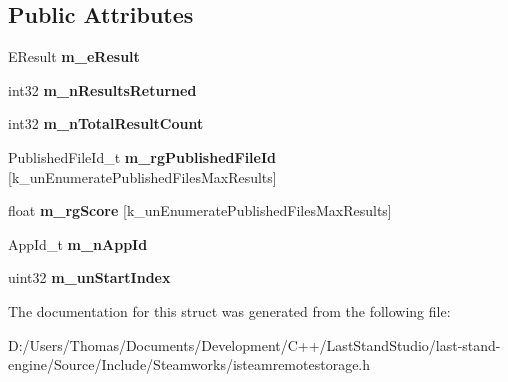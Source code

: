 \subsection*{Public Attributes}
\begin{DoxyCompactItemize}
\item 
\hypertarget{structRemoteStorageEnumerateWorkshopFilesResult__t_a6a98cfa954c7ce0c6ff0c6935a0f55cb}{}E\+Result {\bfseries m\+\_\+e\+Result}\label{structRemoteStorageEnumerateWorkshopFilesResult__t_a6a98cfa954c7ce0c6ff0c6935a0f55cb}

\item 
\hypertarget{structRemoteStorageEnumerateWorkshopFilesResult__t_a88c50bf47247cbf3a4af74aaad227236}{}int32 {\bfseries m\+\_\+n\+Results\+Returned}\label{structRemoteStorageEnumerateWorkshopFilesResult__t_a88c50bf47247cbf3a4af74aaad227236}

\item 
\hypertarget{structRemoteStorageEnumerateWorkshopFilesResult__t_af5e984a3c393dc6c6d34ef38156b280b}{}int32 {\bfseries m\+\_\+n\+Total\+Result\+Count}\label{structRemoteStorageEnumerateWorkshopFilesResult__t_af5e984a3c393dc6c6d34ef38156b280b}

\item 
\hypertarget{structRemoteStorageEnumerateWorkshopFilesResult__t_a9fb6272f5046468cc90f48203a52f71a}{}Published\+File\+Id\+\_\+t {\bfseries m\+\_\+rg\+Published\+File\+Id} \mbox{[}k\+\_\+un\+Enumerate\+Published\+Files\+Max\+Results\mbox{]}\label{structRemoteStorageEnumerateWorkshopFilesResult__t_a9fb6272f5046468cc90f48203a52f71a}

\item 
\hypertarget{structRemoteStorageEnumerateWorkshopFilesResult__t_ac22128e73f11e73c9a6fa612c43f1836}{}float {\bfseries m\+\_\+rg\+Score} \mbox{[}k\+\_\+un\+Enumerate\+Published\+Files\+Max\+Results\mbox{]}\label{structRemoteStorageEnumerateWorkshopFilesResult__t_ac22128e73f11e73c9a6fa612c43f1836}

\item 
\hypertarget{structRemoteStorageEnumerateWorkshopFilesResult__t_ac3f7586dac92d1d1a5798764cfd2c3e4}{}App\+Id\+\_\+t {\bfseries m\+\_\+n\+App\+Id}\label{structRemoteStorageEnumerateWorkshopFilesResult__t_ac3f7586dac92d1d1a5798764cfd2c3e4}

\item 
\hypertarget{structRemoteStorageEnumerateWorkshopFilesResult__t_a0bbb74d2e98fd0adb0904b115c00ecaa}{}uint32 {\bfseries m\+\_\+un\+Start\+Index}\label{structRemoteStorageEnumerateWorkshopFilesResult__t_a0bbb74d2e98fd0adb0904b115c00ecaa}

\end{DoxyCompactItemize}


The documentation for this struct was generated from the following file\+:\begin{DoxyCompactItemize}
\item 
D\+:/\+Users/\+Thomas/\+Documents/\+Development/\+C++/\+Last\+Stand\+Studio/last-\/stand-\/engine/\+Source/\+Include/\+Steamworks/isteamremotestorage.\+h\end{DoxyCompactItemize}
